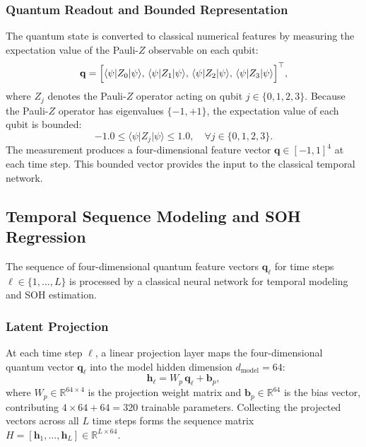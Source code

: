 \documentclass[a4paper,fleqn]{cas-sc}
\begin{document}
\subsubsection{Quantum Readout and Bounded Representation}

The quantum state is converted to classical numerical features by measuring the expectation value of the Pauli-$Z$ observable on each qubit:
\begin{equation}
\mathbf{q} = \Bigl[\langle\psi\rvert Z_0\lvert\psi\rangle,\, \langle\psi\rvert Z_1\lvert\psi\rangle,\, \langle\psi\rvert Z_2\lvert\psi\rangle,\, \langle\psi\rvert Z_3\lvert\psi\rangle\Bigr]^{\top},
\label{eq:pauli-z}
\end{equation}
where $Z_j$ denotes the Pauli-$Z$ operator acting on qubit $j \in \{0, 1, 2, 3\}$. Because the Pauli-$Z$ operator has eigenvalues $\{-1, +1\}$, the expectation value of each qubit is bounded:
\begin{equation}
-1.0 \le \langle\psi\rvert Z_j\lvert\psi\rangle \le 1.0, \quad \forall j \in \{0, 1, 2, 3\}.
\label{eq:bounded}
\end{equation}
The measurement produces a four-dimensional feature vector $\mathbf{q} \in [-1, 1]^4$ at each time step. This bounded vector provides the input to the classical temporal network.

\subsection{Temporal Sequence Modeling and SOH Regression}\label{sec:temporal_modeling}

The sequence of four-dimensional quantum feature vectors $\mathbf{q}_\ell$ for time steps $\ell \in \{1, \dots, L\}$ is processed by a classical neural network for temporal modeling and SOH estimation.

\subsubsection{Latent Projection}

At each time step $\ell$, a linear projection layer maps the four-dimensional quantum vector $\mathbf{q}_{\ell}$ into the model hidden dimension $d_{\mathrm{model}} = 64$:
\begin{equation}
\mathbf{h}_{\ell} = W_{p}\,\mathbf{q}_{\ell} + \mathbf{b}_{p},
\label{eq:proj}
\end{equation}
where $W_p \in \mathbb{R}^{64 \times 4}$ is the projection weight matrix and $\mathbf{b}_p \in \mathbb{R}^{64}$ is the bias vector, contributing $4 \times 64 + 64 = 320$ trainable parameters. Collecting the projected vectors across all $L$ time steps forms the sequence matrix $H = [\mathbf{h}_1, \dots, \mathbf{h}_L] \in \mathbb{R}^{L \times 64}$.
\end{document}
